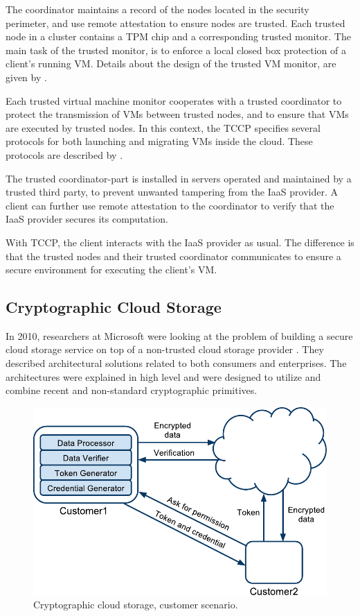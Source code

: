 \documentclass[pdftex,english,10pt,b5paper,twoside]{book}
\begin{document}
The coordinator maintains a record of the nodes located in the security
perimeter, and use remote attestation to ensure nodes are trusted. Each trusted
node in a cluster contains a \ac{TPM} chip and a corresponding trusted monitor.
The main task of the trusted monitor, is to enforce a local closed box
protection of a client's running \ac{VM}. Details about the design of the
trusted \ac{VM} monitor, are given by \citet{tccp}.

Each trusted virtual machine monitor cooperates with a trusted coordinator to
protect the transmission of \acp{VM} between trusted nodes, and to ensure that
\acp{VM} are executed by trusted nodes. In this context, the \ac{TCCP}
specifies several protocols for both launching and migrating \acp{VM} inside
the cloud. These protocols are described by \citet{tccp}.

The trusted coordinator-part is installed in servers operated and maintained by a
trusted third party, to prevent unwanted tampering from the \ac{IaaS} provider.
A client can further use remote attestation to the coordinator to verify that the
\ac{IaaS} provider secures its computation.

With \ac{TCCP}, the client interacts with the \ac{IaaS} provider as usual. The
difference is that the trusted nodes and their trusted coordinator communicates
to ensure a secure environment for executing the client's \ac{VM}.

\subsection{Cryptographic Cloud Storage}

In 2010, researchers at Microsoft were looking at the problem of building a
secure cloud storage service on top of a non-trusted cloud storage provider
\cite{microsoftresearch}. They described architectural solutions related to
both consumers and enterprises. The architectures were explained in high level
and were designed to utilize and combine recent and non-standard cryptographic
primitives.

\begin{figure}[h!]
    \centering
    \includegraphics[scale=0.6]{ArchitectureCCSC.pdf}
    \caption{Cryptographic cloud storage, customer scenario.}
    \label{fig:RW:CCS:CA}
\end{figure}
\end{document}
